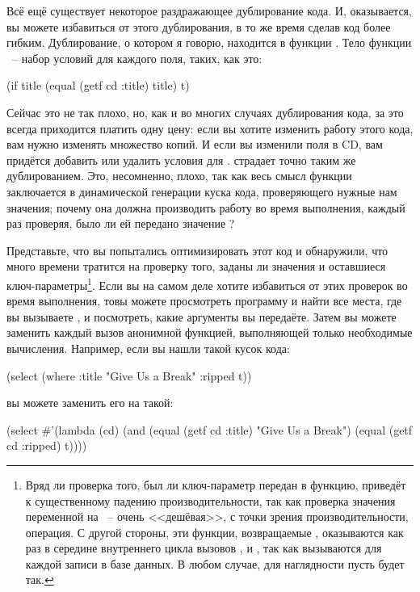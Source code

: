 Всё ещё существует некоторое раздражающее дублирование кода. И, оказывается, вы можете
избавиться от этого дублирования, в то же время сделав код более гибким. Дублирование, о
котором я говорю, находится в функции . Тело функции ~-- набор
условий для каждого поля, таких, как это:

\begin{myverb}
(if title (equal (getf cd :title) title) t)
\end{myverb}

Сейчас это не так плохо, но, как и во многих случаях дублирования кода, за это всегда
приходится платить одну цену: если вы хотите изменить работу этого кода, вам нужно
изменять множество копий. И если вы изменили поля в CD, вам придётся добавить или удалить
условия для .  страдает точно таким же дублированием. Это,
несомненно, плохо, так как весь смысл функции  заключается в динамической
генерации куска кода, проверяющего нужные нам значения; почему она должна производить
работу во время выполнения, каждый раз проверяя, было ли ей передано значение
?

Представьте, что вы попытались оптимизировать этот код и обнаружили, что много времени
тратится на проверку того, заданы ли значения  и оставшиеся
ключ-параметры\footnote{Вряд ли проверка того, был ли ключ-параметр передан в функцию,
  приведёт к существенному падению производительности, так как проверка значения
  переменной на ~-- очень <<дешёвая>>, с точки зрения производительности, операция. С
  другой стороны, эти функции, возвращаемые , оказываются как раз в середине
  внутреннего цикла вызовов ,  и , так как
  вызываются для каждой записи в базе данных. В любом случае, для наглядности пусть будет
  так.}. Если вы на самом деле хотите избавиться от этих проверок во время выполнения, товы
можете просмотреть программу и найти все места, где вы вызываете , и
посмотреть, какие аргументы вы передаёте. Затем вы можете заменить каждый вызов
 анонимной функцией, выполняющей только необходимые вычисления. Например, если
вы нашли такой кусок кода:

\begin{myverb}
(select (where :title "Give Us a Break" :ripped t))
\end{myverb}

\noindent{}вы можете заменить его на такой:

\begin{myverb}
(select
 #'(lambda (cd)
     (and (equal (getf cd :title) "Give Us a Break")
          (equal (getf cd :ripped) t))))
\end{myverb}

